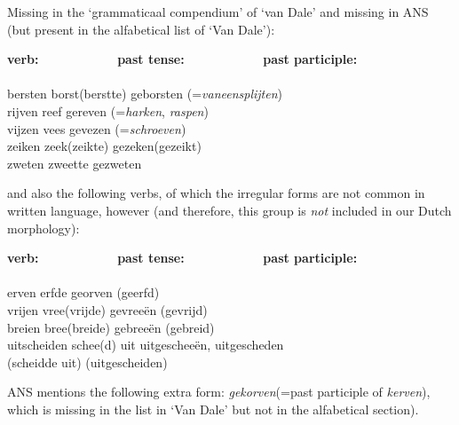 Missing in the `grammaticaal compendium' of `van Dale' and missing in ANS
(but present in the alfabetical list of `Van Dale'):

\begin{tabbing}
{\bf verb:}   \ \ \ \ \ \ \ \ \ \ \ \     \=   
{\bf past tense:}  \ \ \ \ \ \ \ \ \ \ \ \    \=    
{\bf past participle:}  \ \ \ \ \ \ \ \  \=  \\
        \>                   \>                      \>                    \\
bersten \>   borst(berstte)  \>  geborsten    \> (={\em vaneensplijten})   \\
rijven  \>   reef            \>  gereven  \> (={\em harken}, {\em raspen}) \\
vijzen  \>   vees            \>  gevezen      \> (={\em schroeven})        \\
zeiken  \>   zeek(zeikte)    \>  gezeken(gezeikt) \>                       \\
zweten  \>   zweette         \>  gezweten         \>                       \\
\end{tabbing}

and also the following verbs, of which the irregular forms are not common in 
written language, however
(and therefore, this group is {\em not} included in our Dutch morphology):

\begin{tabbing}
{\bf verb:}   \ \ \ \ \ \ \ \ \ \ \ \     \=   
{\bf past tense:}  \ \ \ \ \ \ \ \ \ \ \ \    \=    
{\bf past participle:}  \ \ \ \ \ \ \ \ \ \ \ \   \\
             \>                   \>                                   \\
erven        \>   erfde           \> georven (geerfd)                  \\
vrijen       \>   vree(vrijde)    \> gevree\"{e}n (gevrijd)            \\
breien       \>   bree(breide)    \> gebree\"{e}n (gebreid)            \\
uitscheiden  \>   schee(d) uit    \> uitgeschee\"{e}n, uitgescheden    \\
             \>   (scheidde uit)  \> (uitgescheiden)                   \\
\end{tabbing}

ANS mentions the following extra form: {\em gekorven}(=past participle of 
{\em kerven}),
which is missing in the list in `Van Dale' but not in the alfabetical 
section).

